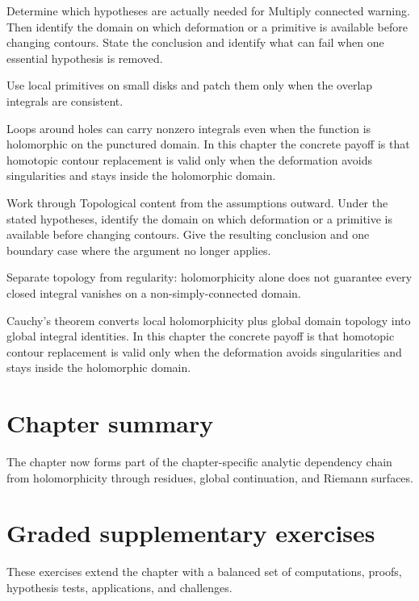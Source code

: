 \begin{exercise}\label{exr:iv05-07}
Determine which hypotheses are actually needed for Multiply connected warning. Then identify the domain on which deformation or a primitive is available before changing contours. State the conclusion and identify what can fail when one essential hypothesis is removed.
\end{exercise}
\begin{hint}
Use local primitives on small disks and patch them only when the overlap integrals are consistent.
\end{hint}
\begin{solution}
Loops around holes can carry nonzero integrals even when the function is holomorphic on the punctured domain. In this chapter the concrete payoff is that homotopic contour replacement is valid only when the deformation avoids singularities and stays inside the holomorphic domain.
\end{solution}

\begin{exercise}\label{exr:iv05-08}
Work through Topological content from the assumptions outward. Under the stated hypotheses, identify the domain on which deformation or a primitive is available before changing contours. Give the resulting conclusion and one boundary case where the argument no longer applies.
\end{exercise}
\begin{hint}
Separate topology from regularity: holomorphicity alone does not guarantee every closed integral vanishes on a non-simply-connected domain.
\end{hint}
\begin{solution}
Cauchy's theorem converts local holomorphicity plus global domain topology into global integral identities. In this chapter the concrete payoff is that homotopic contour replacement is valid only when the deformation avoids singularities and stays inside the holomorphic domain.
\end{solution}

\section*{Chapter summary}
The chapter now forms part of the chapter-specific analytic dependency chain from holomorphicity through residues, global continuation, and Riemann surfaces.
\section{Graded supplementary exercises}
These exercises extend the chapter with a balanced set of computations, proofs, hypothesis tests, applications, and challenges.

